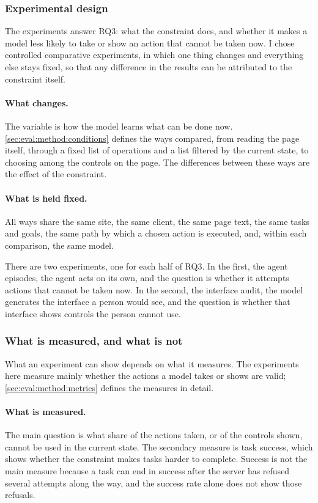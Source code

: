 \subsubsection{Experimental design}\label{sec:methods:experiment}

The experiments answer RQ3: what the constraint does, and whether it makes a model less likely to take or show an action that cannot be taken now.
I chose controlled comparative experiments, in which one thing changes and everything else stays fixed, so that any difference in the results can be attributed to the constraint itself.

\paragraph{What changes.}
The variable is how the model learns what can be done now.
\autoref{sec:eval:method:conditions} defines the ways compared, from reading the page itself, through a fixed list of operations and a list filtered by the current state, to choosing among the controls on the page.
The differences between these ways are the effect of the constraint.

\paragraph{What is held fixed.}
All ways share the same site, the same client, the same page text, the same tasks and goals, the same path by which a chosen action is executed, and, within each comparison, the same model.

There are two experiments, one for each half of RQ3.
In the first, the agent episodes, the agent acts on its own, and the question is whether it attempts actions that cannot be taken now.
In the second, the interface audit, the model generates the interface a person would see, and the question is whether that interface shows controls the person cannot use.

\subsubsection{What is measured, and what is not}\label{sec:methods:measures}

What an experiment can show depends on what it measures.
The experiments here measure mainly whether the actions a model takes or shows are valid; \autoref{sec:eval:method:metrics} defines the measures in detail.

\paragraph{What is measured.}
The main question is what share of the actions taken, or of the controls shown, cannot be used in the current state.
The secondary measure is task success, which shows whether the constraint makes tasks harder to complete.
Success is not the main measure because a task can end in success after the server has refused several attempts along the way, and the success rate alone does not show those refusals.

